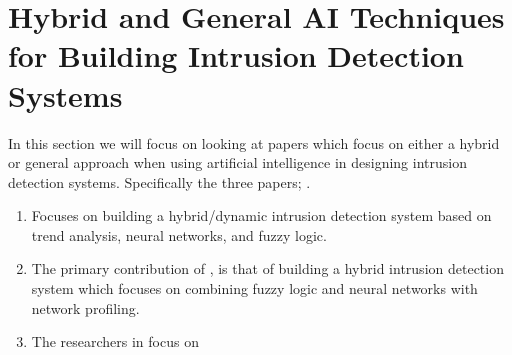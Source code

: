 \section{Hybrid and General AI Techniques for Building Intrusion Detection Systems}
In this section we will focus on looking at papers which focus on either a hybrid or general approach
when using artificial intelligence in designing intrusion detection systems. Specifically the three
papers; .
\begin{enumerate}
    \item \cite{botha01} Focuses on building a hybrid/dynamic intrusion detection system based on trend 
    analysis, neural networks, and fuzzy logic.
    \item The primary contribution of \cite{idris05}, is that of building a hybrid intrusion detection
    system which focuses on combining fuzzy logic and neural networks with network profiling.
    \item The researchers in \cite{kanimozhi19} focus on 
\end{enumerate}